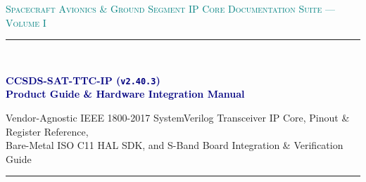 \documentclass[10pt,a4paper]{article}
\renewcommand{\_}{\origunderscore\penalty0\hskip0pt\relax}
\numberwithin{table}{section}
\numberwithin{figure}{section}
\numberwithin{equation}{section}
\begin{document}
\begin{titlepage}
    \centering
    \vspace*{0.20in}
    {\scshape\large\textcolor{teal}{Spacecraft Avionics \& Ground Segment IP Core Documentation Suite --- Volume I}\par}
    \vspace{0.15in}
    \rule{\textwidth}{1.5pt}\\[0.20in]
    {\Huge\bfseries\sffamily\textcolor{navy}{CCSDS-SAT-TTC-IP (\texttt{v2.40.3})\\Product Guide \& Hardware Integration Manual}\par}
    \vspace{0.14in}
    {\large\sffamily\textcolor{slate}{Vendor-Agnostic IEEE 1800-2017 SystemVerilog Transceiver IP Core, Pinout \& Register Reference,\\Bare-Metal ISO C11 HAL SDK, and S-Band Board Integration \& Verification Guide}\par}
    \vspace{0.14in}
    \rule{\textwidth}{1.5pt}\\[0.20in]


\end{titlepage}
\end{document}
